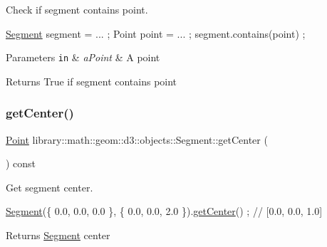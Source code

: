Check if segment contains point. 


\begin{DoxyCode}
\hyperlink{classlibrary_1_1math_1_1geom_1_1d3_1_1objects_1_1_segment_a5562342d1edf2f52e37ce1bc138ee7d7}{Segment} segment = ... ;
Point point = ... ;
segment.contains(point) ;
\end{DoxyCode}



\begin{DoxyParams}[1]{Parameters}
\mbox{\tt in}  & {\em a\+Point} & A point \\
\hline
\end{DoxyParams}
\begin{DoxyReturn}{Returns}
True if segment contains point 
\end{DoxyReturn}
\mbox{\label{classlibrary_1_1math_1_1geom_1_1d3_1_1objects_1_1_segment_a6788da2dd6ee48ded2da197c01ea7f3d}} 
\subsubsection{\texorpdfstring{get\+Center()}{getCenter()}}
{\footnotesize\ttfamily \hyperlink{classlibrary_1_1math_1_1geom_1_1d3_1_1objects_1_1_point}{Point} library\+::math\+::geom\+::d3\+::objects\+::\+Segment\+::get\+Center (\begin{DoxyParamCaption}{ }\end{DoxyParamCaption}) const}



Get segment center. 


\begin{DoxyCode}
\hyperlink{classlibrary_1_1math_1_1geom_1_1d3_1_1objects_1_1_segment_a5562342d1edf2f52e37ce1bc138ee7d7}{Segment}(\{ 0.0, 0.0, 0.0 \}, \{ 0.0, 0.0, 2.0 \}).\hyperlink{classlibrary_1_1math_1_1geom_1_1d3_1_1objects_1_1_segment_a6788da2dd6ee48ded2da197c01ea7f3d}{getCenter}() ; \textcolor{comment}{// [0.0, 0.0, 1.0]}
\end{DoxyCode}


\begin{DoxyReturn}{Returns}
\hyperlink{classlibrary_1_1math_1_1geom_1_1d3_1_1objects_1_1_segment}{Segment} center 
\end{DoxyReturn}
\mbox{\label{classlibrary_1_1math_1_1geom_1_1d3_1_1objects_1_1_segment_afc15a855d660d67e96467466c4442bbc}} 
